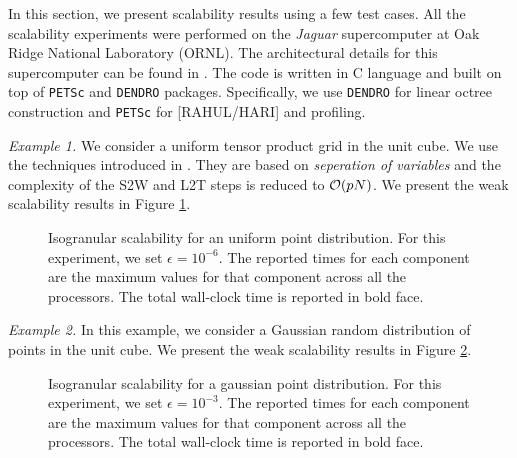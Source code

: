 In this section, we present scalability results using a few test cases.  All the scalability experiments were performed on the {\it{Jaguar}} supercomputer at Oak Ridge National Laboratory (ORNL). The architectural details for this supercomputer can be found in \cite{jaguar}. The code is written in C language and built on top of \texttt{PETSc} and \texttt{DENDRO} packages. Specifically, we use \texttt{DENDRO} for linear octree construction and \texttt{PETSc} for [RAHUL/HARI] and profiling. 

{\em Example 1.} We consider a uniform tensor product grid in the unit cube. We use the techniques introduced in \cite{fggt}. They are based on {\em seperation of variables} and the complexity of the S2W and L2T steps is reduced to $\mathcal{O}(p N)$. We present the weak scalability results in Figure \ref{fig:uniform}. 

\begin{figure}
	\begin{center}
	
	\end{center}
\caption{\label{f:isoUniform} Isogranular scalability for an uniform point distribution. For
 this experiment, we set $\epsilon = 10^{-6}$. The reported times for 
each component are the maximum values for that component across all the processors. The total wall-clock
time is reported in bold face.} \label{fig:uniform}
\end{figure}

{\em Example 2.} In this example, we consider a Gaussian random distribution of points in the unit cube. 
We present the weak scalability results in Figure \ref{fig:nonuniform}. 

\begin{figure}
	\begin{center}
	
	\end{center}
\caption{\label{f:isoGaussian} Isogranular scalability for a gaussian point distribution. For
 this experiment, we set $\epsilon = 10^{-3}$. The reported times for each component are the
 maximum values for that component across all the processors. The total wall-clock
time is reported in bold face.} \label{fig:nonuniform}
\end{figure}
